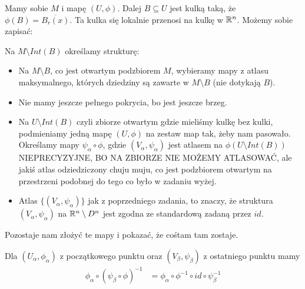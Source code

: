 \documentclass{article}
\begin{document}
Mamy sobie $M$ i mapę $(U, \phi)$. Dalej $B\subseteq U$ jest kulką taką, że
$\phi(B)=\overline{B_r(x)}$. Ta kulka się lokalnie przenosi na kulkę w $\mathbb{R}^n$. Możemy
sobie zapisać:

Na $M\setminus Int(B)$ określamy strukturę:
\begin{itemize}
    \item Na $M\setminus B$, co jest otwartym podzbiorem $M$, wybieramy mapy z atlasu
    maksymalnego, których dziedziny są zawarte w $M\setminus B$ (nie dotykają $B$).
    \item Nie mamy jeszcze pełnego pokrycia, bo jest jeszcze brzeg.
    \item Na $U\setminus Int(B)$ czyli zbiorze otwartym gdzie mieliśmy kulkę bez kulki,
    podmieniamy jedną mapę $(U,\phi)$ na zestaw map tak, żeby nam pasowało. Określamy mapy
    $\psi_\alpha\circ\phi$, gdzie $(V_\alpha,\psi_\alpha)$ jest atlasem na
    $\phi(U\setminus Int(B))${\color{red}NIEPRECYZYJNE, BO NA ZBIORZE NIE MOŻEMY
    ATLASOWAĆ, ale jakiś atlas odziedziczony chuju muju}, co jest podzbiorem otwartym na
    przestrzeni podobnej do tego co było w zadaniu wyżej.
    \item Atlas $\{(V_\alpha,\psi_\alpha)\}$ jak z poprzedniego zadania, to znaczy, że
    struktura $(V_\alpha,\psi_\alpha)$ na $\mathbb{R}^n\setminus D^n$ jest zgodna ze standardową
    zadaną przez $id$. 

\end{itemize}

Pozostaje nam złożyć te mapy i pokazać, że cośtam tam zostaje.

Dla $(U_\alpha,\phi_\alpha)$ z początkowego punktu oraz $(V_\beta,\psi_\beta)$ z
ostatniego punktu mamy
\begin{align*}
\phi_\alpha\circ(\psi_\beta\circ\phi)^{-1}&=\phi_\alpha\circ\phi^{-1}\circ id\circ\psi_\beta^{-1}
\end{align*}
\end{document}
